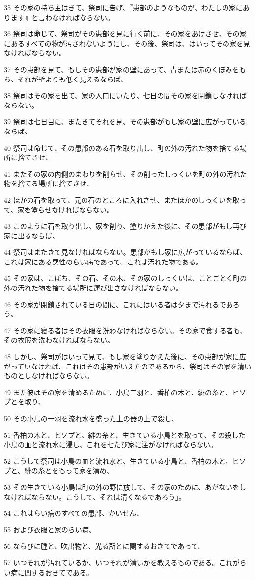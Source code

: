 \par 35 その家の持ち主はきて、祭司に告げ、『患部のようなものが、わたしの家にあります』と言わなければならない。
\par 36 祭司は命じて、祭司がその患部を見に行く前に、その家をあけさせ、その家にあるすべての物が汚されないようにし、その後、祭司は、はいってその家を見なければならない。
\par 37 その患部を見て、もしその患部が家の壁にあって、青または赤のくぼみをもち、それが壁よりも低く見えるならば、
\par 38 祭司はその家を出て、家の入口にいたり、七日の間その家を閉鎖しなければならない。
\par 39 祭司は七日目に、またきてそれを見、その患部がもし家の壁に広がっているならば、
\par 40 祭司は命じて、その患部のある石を取り出し、町の外の汚れた物を捨てる場所に捨てさせ、
\par 41 またその家の内側のまわりを削らせ、その削ったしっくいを町の外の汚れた物を捨てる場所に捨てさせ、
\par 42 ほかの石を取って、元の石のところに入れさせ、またほかのしっくいを取って、家を塗らせなければならない。
\par 43 このように石を取り出し、家を削り、塗りかえた後に、その患部がもし再び家に出るならば、
\par 44 祭司はまたきて見なければならない。患部がもし家に広がっているならば、これは家にある悪性のらい病であって、これは汚れた物である。
\par 45 その家は、こぼち、その石、その木、その家のしっくいは、ことごとく町の外の汚れた物を捨てる場所に運び出さなければならない。
\par 46 その家が閉鎖されている日の間に、これにはいる者は夕まで汚れるであろう。
\par 47 その家に寝る者はその衣服を洗わなければならない。その家で食する者も、その衣服を洗わなければならない。
\par 48 しかし、祭司がはいって見て、もし家を塗りかえた後に、その患部が家に広がっていなければ、これはその患部がいえたのであるから、祭司はその家を清いものとしなければならない。
\par 49 また彼はその家を清めるために、小鳥二羽と、香柏の木と、緋の糸と、ヒソプとを取り、
\par 50 その小鳥の一羽を流れ水を盛った土の器の上で殺し、
\par 51 香柏の木と、ヒソプと、緋の糸と、生きている小鳥とを取って、その殺した小鳥の血と流れ水に浸し、これを七たび家に注がなければならない。
\par 52 こうして祭司は小鳥の血と流れ水と、生きている小鳥と、香柏の木と、ヒソプと、緋の糸とをもって家を清め、
\par 53 その生きている小鳥は町の外の野に放して、その家のために、あがないをしなければならない。こうして、それは清くなるであろう」。
\par 54 これはらい病のすべての患部、かいせん、
\par 55 および衣服と家のらい病、
\par 56 ならびに腫と、吹出物と、光る所とに関するおきてであって、
\par 57 いつそれが汚れているか、いつそれが清いかを教えるものである。これがらい病に関するおきてである。

